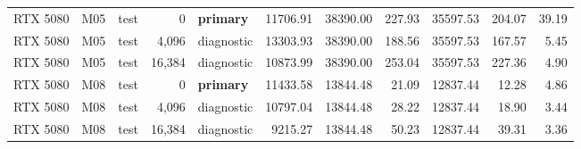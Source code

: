 \documentclass[10pt]{article}
\begin{document}
\begin{landscape}
\begin{longtable}{@{}l l l r l r r r r r r@{}}
RTX 5080 & M05 & test & 0 & \textbf{primary} & 11706.91 & 38390.00 & 227.93 & 35597.53 & 204.07 & 39.19 \\
RTX 5080 & M05 & test & 4,096 & diagnostic & 13303.93 & 38390.00 & 188.56 & 35597.53 & 167.57 & 5.45 \\
RTX 5080 & M05 & test & 16,384 & diagnostic & 10873.99 & 38390.00 & 253.04 & 35597.53 & 227.36 & 4.90 \\
RTX 5080 & M08 & test & 0 & \textbf{primary} & 11433.58 & 13844.48 & 21.09 & 12837.44 & 12.28 & 4.86 \\
RTX 5080 & M08 & test & 4,096 & diagnostic & 10797.04 & 13844.48 & 28.22 & 12837.44 & 18.90 & 3.44 \\
RTX 5080 & M08 & test & 16,384 & diagnostic & 9215.27 & 13844.48 & 50.23 & 12837.44 & 39.31 & 3.36 \\
\end{longtable}
\endgroup
\end{landscape}
\end{document}
